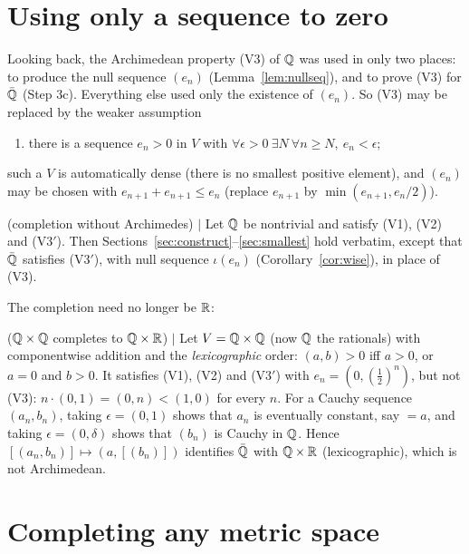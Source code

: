 \newpage
\section{Using only a sequence to zero} \label{sec:nullseq}

Looking back, the Archimedean property (V3) of $\mathbb{Q}$ was used in only two
places: to produce the null sequence $(e_n)$ (Lemma~\ref{lem:nullseq}), and to
prove (V3) for $\bar{\mathbb{Q}}$ (Step 3c). Everything else used only the existence of
$(e_n)$. So (V3) may be replaced by the weaker assumption
\begin{enumerate}[nosep,leftmargin=4em]
    \item[(V3$'$)] there is a sequence $e_n>0$ in $V$ with
    $\forall\epsilon>0\ \exists N\ \forall n\ge N,\ e_n<\epsilon$;
\end{enumerate}
such a $V$ is automatically dense (there is no smallest positive element),
and $(e_n)$ may be chosen with $e_{n+1}+e_{n+1}\le e_n$ (replace $e_{n+1}$ by
$\min(e_{n+1},e_n/2)$).

\begin{theorem} (completion without Archimedes) $\mid$ \label{thm:V3prime}
Let $\mathbb{Q}$ be nontrivial and satisfy (V1), (V2) and (V3$'$). Then
Sections~\ref{sec:construct}--\ref{sec:smallest} hold verbatim, except that
$\bar{\mathbb{Q}}$ satisfies (V3$'$), with null sequence $\iota(e_n)$
(Corollary~\ref{cor:wise}), in place of (V3).
\end{theorem}

The completion need no longer be $\mathbb{R}$:

\begin{example} ($\mathbb{Q}\times\mathbb{Q}$ completes to $\mathbb{Q}\times\mathbb{R}$) $\mid$ \label{ex:lex}
Let $V=\mathbb{Q}\times\mathbb{Q}$ (now $\mathbb{Q}$ the rationals) with componentwise addition and the
\emph{lexicographic} order: $(a,b)>0$ iff $a>0$, or $a=0$ and $b>0$. It
satisfies (V1), (V2) and (V3$'$) with $e_n=(0,(\tfrac12)^n)$, but not (V3):
$n\cdot(0,1)=(0,n)<(1,0)$ for every $n$. For a Cauchy sequence $(a_n,b_n)$,
taking $\epsilon=(0,1)$ shows that $a_n$ is eventually constant, say $=a$, and
taking $\epsilon=(0,\delta)$ shows that $(b_n)$ is Cauchy in $\mathbb{Q}$. Hence
$[(a_n,b_n)]\mapsto(a,[(b_n)])$ identifies $\bar{\mathbb{Q}}$ with $\mathbb{Q}\times\mathbb{R}$
(lexicographic), which is not Archimedean.
\end{example}


\section{Completing any metric space}

